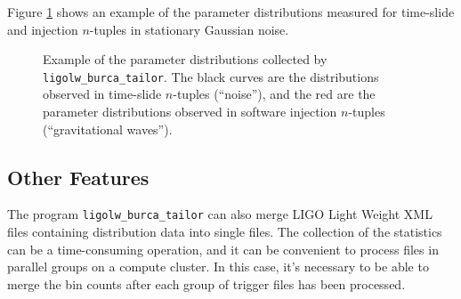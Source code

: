 \documentclass[10pt]{article}
\newcommand{\prog}[1]{\texttt{#1}}
\begin{document}
Figure \ref{fig3} shows an example of the parameter distributions measured
for time-slide and injection \(n\)-tuples in stationary Gaussian noise.
\begin{figure}
\begin{center}
\end{center}
\caption{Example of the parameter distributions collected by
\prog{ligolw\_burca\_tailor}.  The black curves are the distributions
observed in time-slide \(n\)-tuples (``noise''), and the red are the
parameter distributions observed in software injection \(n\)-tuples
(``gravitational waves'').}
\label{fig3}
\end{figure}


\subsection{Other Features}


The program \prog{ligolw\_burca\_tailor} can also merge LIGO Light Weight
XML files containing distribution data into single files.  The collection
of the statistics can be a time-consuming operation, and it can be
convenient to process files in parallel groups on a compute cluster.  In
this case, it's necessary to be able to merge the bin counts after each
group of trigger files has been processed.
\end{document}
